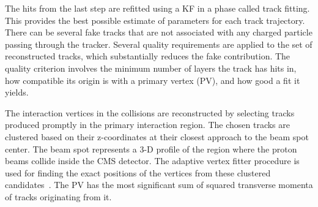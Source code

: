 The hits from the last step are refitted using a KF in a phase called track fitting. This provides the best possible estimate of parameters for each track trajectory. There can be several fake tracks that are not associated with any charged particle passing through the tracker. Several quality requirements are applied to the set of reconstructed tracks, which substantially reduces the fake contribution. The quality criterion involves the minimum number of layers the track has hits in, how compatible its origin is with a primary vertex (PV), and how good a fit it yields.

The interaction vertices in the \pp collisions are reconstructed by selecting tracks produced promptly in the primary interaction region. The chosen tracks are clustered based on their z-coordinates at their closest approach to the beam spot center. The beam spot represents a 3-D profile of the region where the proton beams collide inside the CMS detector. The adaptive vertex fitter procedure is used for finding the exact positions of the vertices from these clustered candidates~\cite{Fruhwirth:2007hz}. The PV has the most significant sum of squared transverse momenta of tracks originating from it.

